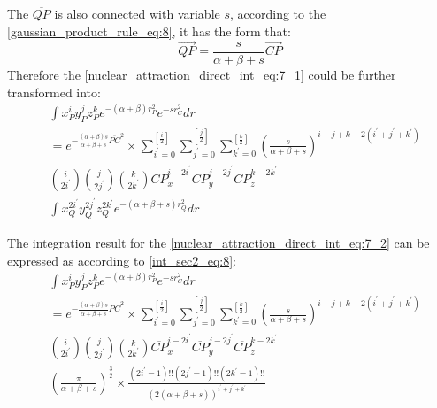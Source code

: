 The $\overline{QP}$ is also connected with variable $s$, according to the 
\ref{gaussian_product_rule_eq:8}, it has the form that:
\begin{equation}
 \overrightarrow{QP} = \frac{s}{\alpha+\beta+s}\overrightarrow{CP}
\end{equation}
Therefore the \ref{nuclear_attraction_direct_int_eq:7_1} could be further transformed into:
\begin{equation}
\begin{split}
&\int x_{P}^{i}y_{P}^{j}z_{P}^{k} e^{-(\alpha+\beta)r_{P}^{2}}e^{-sr_{C}^{2}} dr  \\
&=
e^{-\frac{(\alpha+\beta)s}{\alpha+\beta + s} \overline{PC}^{2}}\times
\sum_{i^{'}=0}^{\left[ \frac{i}{2}\right] }
\sum_{j^{'}=0}^{\left[ \frac{j}{2}\right]}
\sum_{k^{'}=0}^{\left[ \frac{k}{2}\right]}
\left( \frac{s}{\alpha+\beta+s}\right)^{i+j+k-2(i^{'}+j^{'}+k^{'})} \\
&\binom{i}{2i^{'}}\binom{j}{2j^{'}}\binom{k}{2k^{'}}
\overline{CP}_{x}^{i-2i^{'}}\overline{CP}_{y}^{j-2j^{'}}\overline{CP}_{z}^{k-2k^{'}} \\
&\int x_{Q}^{2i^{'}}y_{Q}^{2j^{'}}z_{Q}^{2k^{'}} e^{-(\alpha+\beta+s)r_{Q}^{2}} dr
\end{split}
 \label{nuclear_attraction_direct_int_eq:7_2}
\end{equation}

The integration result for the \ref{nuclear_attraction_direct_int_eq:7_2} can be expressed as according 
to \ref{int_sec2_eq:8}:
\begin{equation}
\begin{split}
 &\int x_{P}^{i}y_{P}^{j}z_{P}^{k} e^{-(\alpha+\beta)r_{P}^{2}}e^{-sr_{C}^{2}} dr  \\
&=
e^{-\frac{(\alpha+\beta)s}{\alpha+\beta + s} \overline{PC}^{2}}\times
\sum_{i^{'}=0}^{\left[ \frac{i}{2}\right]}
\sum_{j^{'}=0}^{\left[ \frac{j}{2}\right]}
\sum_{k^{'}=0}^{\left[ \frac{k}{2}\right]}
\left( \frac{s}{\alpha+\beta+s}\right)^{i+j+k-2(i^{'}+j^{'}+k^{'})} \\
&\binom{i}{2i^{'}}\binom{j}{2j^{'}}\binom{k}{2k^{'}}
\overline{CP}_{x}^{i-2i^{'}}\overline{CP}_{y}^{j-2j^{'}}\overline{CP}_{z}^{k-2k^{'}} \\
&\left( \frac{\pi}{\alpha+\beta+s}\right)^{\frac{3}{2}}\times
\frac{(2i^{'}-1)!!(2j^{'}-1)!!(2k^{'}-1)!!}
{(2(\alpha+\beta+s))^{i^{'}+j^{'}+k^{'}}} 
\end{split}
 \label{nuclear_attraction_direct_int_eq:8}
\end{equation}

